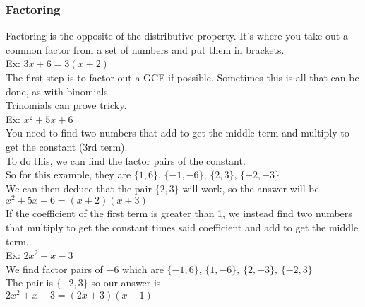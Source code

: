 \subsubsection{Factoring}
Factoring is the opposite of the distributive property. It's where you take out a common factor from a set of numbers and put them in brackets.\\
Ex: $3x+6=3(x+2)$\\
The first step is to factor out a GCF if possible. Sometimes this is all that can be done, as with binomials.\\
Trinomials can prove tricky.\\
Ex: $x^2+5x+6$\\
You need to find two numbers that add to get the middle term and multiply to get the constant (3rd term).\\
To do this, we can find the factor pairs of the constant.\\
So for this example, they are $\{1,6\},\,\{-1,-6\},\,\{2,3\},\,\{-2,-3\}$\\
We can then deduce that the pair $\{2,3\}$ will work, so the answer will be\\ ${x^2+5x+6=(x+2)(x+3)}$\\
If the coefficient of the first term is greater than 1, we instead find two numbers that multiply to get the constant times said coefficient and add to get the middle term.\\
Ex: $2x^2+x-3$\\
We find factor pairs of $-6$ which are $\{-1,6\},\,\{1,-6\},\,\{2,-3\},\,\{-2,3\}$\\
The pair is $\{-2,3\}$ so our answer is\\
$2x^2+x-3=(2x+3)(x-1)$